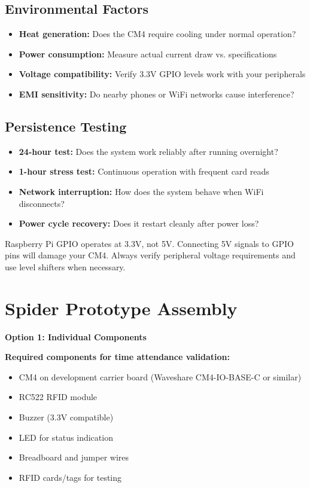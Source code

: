 \subsection{Environmental Factors}
\begin{itemize}
\item \textbf{Heat generation:} Does the CM4 require cooling under normal operation?
\item \textbf{Power consumption:} Measure actual current draw vs. specifications
\item \textbf{Voltage compatibility:} Verify 3.3V GPIO levels work with your peripherals
\item \textbf{EMI sensitivity:} Do nearby phones or WiFi networks cause interference?
\end{itemize}

\subsection{Persistence Testing}
\begin{itemize}
\item \textbf{24-hour test:} Does the system work reliably after running overnight?
\item \textbf{1-hour stress test:} Continuous operation with frequent card reads
\item \textbf{Network interruption:} How does the system behave when WiFi disconnects?
\item \textbf{Power cycle recovery:} Does it restart cleanly after power loss?
\end{itemize}

\begin{tcolorbox}[colback=red!10,colframe=red!75!black,title=Critical Voltage Warning]
Raspberry Pi GPIO operates at 3.3V, not 5V. Connecting 5V signals to GPIO pins will damage your CM4. Always verify peripheral voltage requirements and use level shifters when necessary.
\end{tcolorbox}

\section{Spider Prototype Assembly}

\textbf{Option 1: Individual Components}

\textbf{Required components for time attendance validation:}
\begin{itemize}
\item CM4 on development carrier board (Waveshare CM4-IO-BASE-C or similar)
\item RC522 RFID module
\item Buzzer (3.3V compatible)
\item LED for status indication
\item Breadboard and jumper wires
\item RFID cards/tags for testing
\end{itemize}

